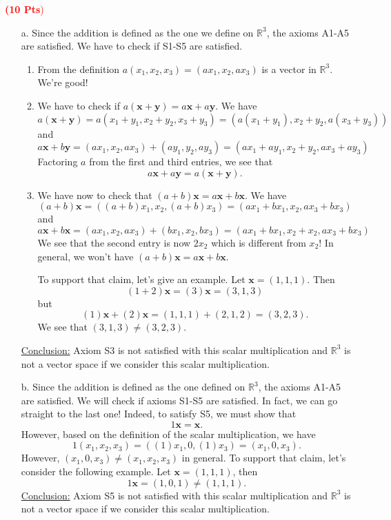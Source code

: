 \documentclass[12pt]{article}
\newcommand{\exo}[3]{\noindent\textcolor{red}{\fbox{\textbf{Section {#1} | Problem {#2}}}\hrulefill   \textbf{({#3} Pts})}\vspace*{10pt}}
\begin{document}
		\exo{6.1}{1}{10} 
		\begin{enumerate}
			\item[a.] Since the addition is defined as the one we define on $\mathbb{R}^3$, the axioms A1-A5 are satisfied. We have to check if S1-S5 are satisfied.
				\begin{enumerate}[label=S\arabic*.]
					\item From the definition $a (x_1, x_2, x_3) = (ax_1, x_2, ax_3)$ is a vector in $\mathbb{R}^3$. We're good!
					\item We have to check if $a (\mathbf{x} + \mathbf{y} ) = a \mathbf{x} + a\mathbf{y}$. We have
						\[
							a (\mathbf{x} + \mathbf{y}) = a (x_1 + y_1 , x_2 + y_2 , x_3 + y_3) = ( a (x_1 + y_1), x_2 + y_2 , a (x_3 + y_3) ) 
						\]
					and
						\[
							a \mathbf{x} + b \mathbf{y} = (a x_1 , x_2 , a x_3) + (ay_1 , y_2 , ay_3) = (a x_1 + ay_1 , x_2 + y_2 , a x_3 + a y_3 ) 
						\]
					Factoring $a$ from the first and third entries, we see that
						\[
							a \mathbf{x} + a \mathbf{y} = a (\mathbf{x} + \mathbf{y} ) .
						\]
					\item We have now to check that $(a + b) \mathbf{x} = a \mathbf{x} + b \mathbf{x}$. We have
						\[
							(a + b) \mathbf{x} = ( (a + b) x_1 , x_2 , (a + b) x_3 ) = (a x_1 + b x_1 , x_2 , a x_3 + b x_3 ) 
						\]
					and
						\[
							a \mathbf{x} + b \mathbf{x} = (a x_1 , x_2 , a x_3) + (b x_1 , x_2 , b x_3) = (ax_1 + bx_1 , x_2 + x_2 , a x_3 + b x_3 )
						\]
					We see that the second entry is now $2x_2$ which is different from $x_2$! In general, we won't have $(a + b) \mathbf{x} = a \mathbf{x} + b \mathbf{x}$.

					To support that claim, let's give an example. Let $\mathbf{x} = (1, 1, 1)$. Then
						\[
							(1 + 2 ) \mathbf{x} = (3) \mathbf{x} = (3, 1, 3) 
						\]
					but
						\[
							(1) \mathbf{x} + (2) \mathbf{x} = (1, 1, 1) + (2, 1, 2) = (3, 2, 3) .
						\]
					We see that $(3, 1, 3) \neq (3, 2, 3)$. 
				\end{enumerate}
				\underline{Conclusion:} Axiom S3 is not satisfied with this scalar multiplication and $\mathbb{R}^3$ is not a vector space if we consider this scalar multiplication.
			\item[b.] Since the addition is defined as the one defined on $\mathbb{R}^3$, the axioms A1-A5 are satisfied. We will check if axioms S1-S5 are satisfied. In fact, we can go straight to the last one! Indeed, to satisfy S5, we must show that 
				\[
					1 \mathbf{x} = \mathbf{x} .
				\]
			However, based on the definition of the scalar multiplication, we have
				\[
					1 (x_1 , x_2 , x_3) = ( (1) x_1 , 0 , (1) x_3) = (x_1 , 0 , x_3) .
				\]
			However, $(x_1 , 0 , x_3) \neq (x_1 , x_2 , x_3)$ in general. To support that claim, let's consider the following example. Let $\mathbf{x} = (1, 1, 1)$, then
				\[
					1 \mathbf{x} = (1, 0, 1) \neq (1, 1, 1) .
				\]
			\underline{Conclusion:} Axiom S5 is not satisfied with this scalar multiplication and $\mathbb{R}^3$ is not a vector space if we consider this scalar multiplication.
		\end{enumerate}
\end{document}
